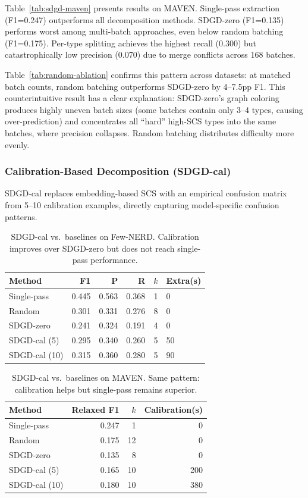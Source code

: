 \documentclass[11pt,a4paper]{article}
\begin{document}
Table~\ref{tab:sdgd-maven} presents results on MAVEN. Single-pass extraction (F1=0.247) outperforms all decomposition methods. SDGD-zero (F1=0.135) performs worst among multi-batch approaches, even below random batching (F1=0.175). Per-type splitting achieves the highest recall (0.300) but catastrophically low precision (0.070) due to merge conflicts across 168 batches.

Table~\ref{tab:random-ablation} confirms this pattern across datasets: at matched batch counts, random batching outperforms SDGD-zero by 4--7.5pp F1. This counterintuitive result has a clear explanation: SDGD-zero's graph coloring produces highly uneven batch sizes (some batches contain only 3--4 types, causing over-prediction) and concentrates all ``hard'' high-SCS types into the same batches, where precision collapses. Random batching distributes difficulty more evenly.

\subsubsection{Calibration-Based Decomposition (SDGD-cal)}

SDGD-cal replaces embedding-based SCS with an empirical confusion matrix from 5--10 calibration examples, directly capturing model-specific confusion patterns.

\begin{table}[t]
\centering
\caption{SDGD-cal vs.\ baselines on Few-NERD. Calibration improves over SDGD-zero but does not reach single-pass performance.}
\label{tab:sdgd-cal-fewnerd}
\begin{tabular}{lrrrrl}
\toprule
Method & F1 & P & R & $k$ & Extra(s) \\
\midrule
Single-pass    & 0.445 & 0.563 & 0.368 & 1 & 0  \\
Random         & 0.301 & 0.331 & 0.276 & 8 & 0  \\
SDGD-zero      & 0.241 & 0.324 & 0.191 & 4 & 0  \\
SDGD-cal (5)   & 0.295 & 0.340 & 0.260 & 5 & 50 \\
SDGD-cal (10)  & 0.315 & 0.360 & 0.280 & 5 & 90 \\
\bottomrule
\end{tabular}
\end{table}

\begin{table}[t]
\centering
\caption{SDGD-cal vs.\ baselines on MAVEN. Same pattern: calibration helps but single-pass remains superior.}
\label{tab:sdgd-cal-maven}
\begin{tabular}{lrrr}
\toprule
Method & Relaxed F1 & $k$ & Calibration(s) \\
\midrule
Single-pass    & 0.247 & 1  & 0   \\
Random         & 0.175 & 12 & 0   \\
SDGD-zero      & 0.135 & 8  & 0   \\
SDGD-cal (5)   & 0.165 & 10 & 200 \\
SDGD-cal (10)  & 0.180 & 10 & 380 \\
\bottomrule
\end{tabular}
\end{table}
\end{document}
